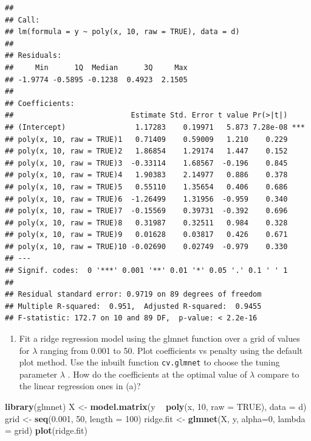 \documentclass[]{article}
\newenvironment{Shaded}{\begin{snugshade}}{\end{snugshade}}
\newcommand{\DataTypeTok}[1]{\textcolor[rgb]{0.13,0.29,0.53}{#1}}
\newcommand{\DecValTok}[1]{\textcolor[rgb]{0.00,0.00,0.81}{#1}}
\newcommand{\FloatTok}[1]{\textcolor[rgb]{0.00,0.00,0.81}{#1}}
\newcommand{\KeywordTok}[1]{\textcolor[rgb]{0.13,0.29,0.53}{\textbf{#1}}}
\newcommand{\NormalTok}[1]{#1}
\newcommand{\OperatorTok}[1]{\textcolor[rgb]{0.81,0.36,0.00}{\textbf{#1}}}
\newcommand{\OtherTok}[1]{\textcolor[rgb]{0.56,0.35,0.01}{#1}}
\newcommand{\StringTok}[1]{\textcolor[rgb]{0.31,0.60,0.02}{#1}}
\providecommand{\tightlist}{%
  \setlength{\itemsep}{0pt}\setlength{\parskip}{0pt}}
\begin{document}
\begin{verbatim}
## 
## Call:
## lm(formula = y ~ poly(x, 10, raw = TRUE), data = d)
## 
## Residuals:
##     Min      1Q  Median      3Q     Max 
## -1.9774 -0.5895 -0.1238  0.4923  2.1505 
## 
## Coefficients:
##                           Estimate Std. Error t value Pr(>|t|)    
## (Intercept)                1.17283    0.19971   5.873 7.28e-08 ***
## poly(x, 10, raw = TRUE)1   0.71409    0.59009   1.210    0.229    
## poly(x, 10, raw = TRUE)2   1.86854    1.29174   1.447    0.152    
## poly(x, 10, raw = TRUE)3  -0.33114    1.68567  -0.196    0.845    
## poly(x, 10, raw = TRUE)4   1.90383    2.14977   0.886    0.378    
## poly(x, 10, raw = TRUE)5   0.55110    1.35654   0.406    0.686    
## poly(x, 10, raw = TRUE)6  -1.26499    1.31956  -0.959    0.340    
## poly(x, 10, raw = TRUE)7  -0.15569    0.39731  -0.392    0.696    
## poly(x, 10, raw = TRUE)8   0.31987    0.32511   0.984    0.328    
## poly(x, 10, raw = TRUE)9   0.01628    0.03817   0.426    0.671    
## poly(x, 10, raw = TRUE)10 -0.02690    0.02749  -0.979    0.330    
## ---
## Signif. codes:  0 '***' 0.001 '**' 0.01 '*' 0.05 '.' 0.1 ' ' 1
## 
## Residual standard error: 0.9719 on 89 degrees of freedom
## Multiple R-squared:  0.951,  Adjusted R-squared:  0.9455 
## F-statistic: 172.7 on 10 and 89 DF,  p-value: < 2.2e-16
\end{verbatim}

\begin{enumerate}
\def\labelenumi{(\alph{enumi})}
\setcounter{enumi}{1}
\tightlist
\item
  Fit a ridge regression model using the glmnet function over a grid of
  values for \(\lambda\) ranging from 0.001 to 50. Plot coefficients vs
  penalty using the default plot method. Use the inbuilt function
  \texttt{cv.glmnet} to choose the tuning parameter \(\lambda\) . How do
  the coefficients at the optimal value of \(\lambda\) compare to the
  linear regression ones in (a)?
\end{enumerate}

\begin{Shaded}
\begin{Highlighting}[]
\KeywordTok{library}\NormalTok{(glmnet)}
\NormalTok{X <-}\StringTok{ }\KeywordTok{model.matrix}\NormalTok{(y }\OperatorTok{~}\StringTok{ }\KeywordTok{poly}\NormalTok{(x, }\DecValTok{10}\NormalTok{, }\DataTypeTok{raw =} \OtherTok{TRUE}\NormalTok{), }\DataTypeTok{data =}\NormalTok{ d)}
\NormalTok{grid <-}\StringTok{ }\KeywordTok{seq}\NormalTok{(}\FloatTok{0.001}\NormalTok{, }\DecValTok{50}\NormalTok{, }\DataTypeTok{length =} \DecValTok{100}\NormalTok{) }
\NormalTok{ridge.fit <-}\StringTok{ }\KeywordTok{glmnet}\NormalTok{(X, y, }\DataTypeTok{alpha=}\DecValTok{0}\NormalTok{, }\DataTypeTok{lambda =}\NormalTok{ grid)}
\KeywordTok{plot}\NormalTok{(ridge.fit)}
\end{Highlighting}
\end{Shaded}
\end{document}
